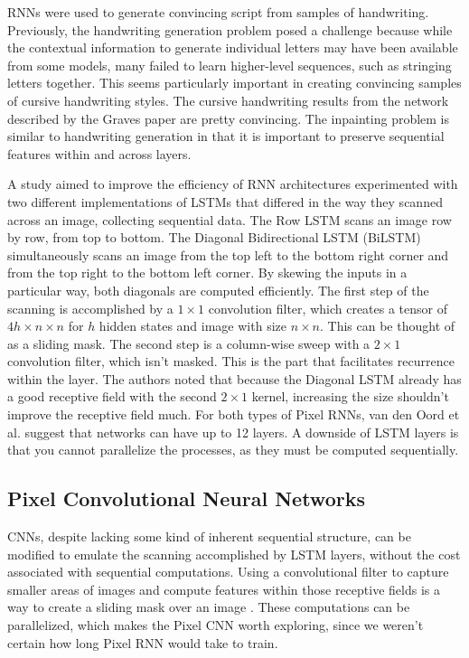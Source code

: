 \documentclass[10pt,twocolumn,letterpaper]{article}
\begin{document}
RNNs were used to generate convincing script from samples of handwriting. Previously, the handwriting generation problem posed a challenge because while the contextual information to generate individual letters may have been available from some models, many failed to learn higher-level sequences, such as stringing letters together. \cite{handwritingRNN} This seems particularly important in creating convincing samples of cursive handwriting styles. The cursive handwriting results from the network described by the Graves paper are pretty convincing. The inpainting problem is similar to handwriting generation in that it is important to preserve sequential features within and across layers.\\

\par
A study aimed to improve the efficiency of RNN architectures experimented with two different implementations of LSTMs that differed in the way they scanned across an image, collecting sequential data. The Row LSTM scans an image row by row, from top to bottom. The Diagonal Bidirectional LSTM (BiLSTM) simultaneously scans an image from the top left to the bottom right corner and from the top right to the bottom left corner. By skewing the inputs in a particular way, both diagonals are computed efficiently. The first step of the scanning is accomplished by a $1 \times 1$ convolution filter, which creates a tensor of $4h \times n \times n$ for $h$ hidden states and image with size $n \times n$. This can be thought of as a sliding mask. The second step is a column-wise sweep with a $2  \times  1$ convolution filter, which isn't masked. This is the part that facilitates recurrence within the layer. The authors noted that because the Diagonal LSTM already has a good receptive field with the second $2  \times  1$ kernel, increasing the size shouldn't improve the receptive field much. For both types of Pixel RNNs, van den Oord et al. suggest that networks can have up to 12 layers. A downside of LSTM layers is that you cannot parallelize the processes, as they must be computed sequentially. \cite{pixelRNN}

\subsection{Pixel Convolutional Neural Networks}
CNNs, despite lacking some kind of inherent sequential structure, can be modified to emulate the scanning accomplished by LSTM layers, without the cost associated with sequential computations. Using a convolutional filter to capture smaller areas of images and compute features within those receptive fields is a way to create a sliding mask over an image \cite{pixelRNN}. These computations can be parallelized, which makes the Pixel CNN worth exploring, since we weren't certain how long Pixel RNN would take to train. 
\end{document}
